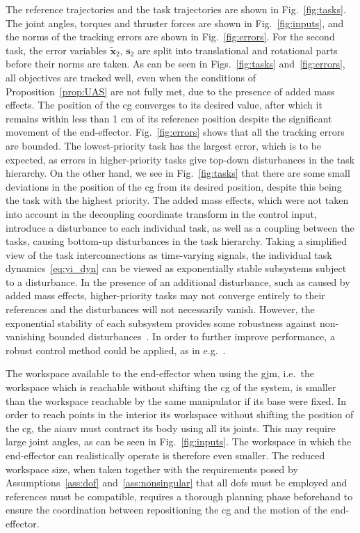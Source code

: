 \documentclass[../main.tex]{subfiles}
\begin{document}
 The reference trajectories and the task trajectories are shown in Fig.~\ref{fig:tasks}. The joint angles, torques and thruster forces are shown in Fig.~\ref{fig:inputs}, and the norms of the tracking errors are shown in Fig.~\ref{fig:errors}. For the second task, the error variables $\tilde{\bm{x}}_2,\, \bm{s}_2$ are split into translational and rotational parts before their norms are taken. As can be seen in Figs.~\ref{fig:tasks} and~\ref{fig:errors}, all objectives are tracked well, even when the conditions of Proposition~\ref{prop:UAS} are not fully met, due to the presence of added mass effects. The position of the \gls{cg} converges to its desired value, after which it remains within less than 1 cm of its reference position despite the significant movement of the end-effector.
Fig.~\ref{fig:errors} shows that all the tracking errors are bounded. The lowest-priority task has the largest error, which is to be expected, as errors in higher-priority tasks give top-down disturbances in the task hierarchy. On the other hand, we see in Fig.~\ref{fig:tasks} that there are some small deviations in the position of the \gls{cg} from its desired position, despite this being the task with the highest priority. %
The added mass effects, which were not taken into account in the decoupling coordinate transform in the control input, introduce a disturbance to each individual task, as well as a coupling between the tasks, causing bottom-up disturbances in the task hierarchy.
Taking a simplified view of the task interconnections as time-varying signals, the individual task dynamics~\eqref{eq:yi_dyn} can be viewed as exponentially stable subsystems subject to a disturbance. In the presence of an additional disturbance, such as caused by added mass effects, higher-priority tasks may not converge entirely to their references and the disturbances will not necessarily vanish. However, the exponential stability of each subsystem provides some robustness against non-vanishing bounded disturbances~\citep[Lemma 9.2]{Khalil}. In order to further improve performance, a robust control method could be applied, as in e.g.~\cite{DyrhaugTveter2023}.

The workspace available to the end-effector when using the \gls{gjm}, i.e.~the workspace which is reachable without shifting the \gls{cg} of the system, is smaller than the workspace reachable by the same manipulator if its base were fixed. %
 In order to reach points in the interior its workspace without shifting the position of the \gls{cg}, the \gls{aiauv} must contract its body using all its joints. This may require large joint angles, as can be seen in Fig.~\ref{fig:inputs}. The workspace in which the end-effector can realistically operate is therefore even smaller. The reduced workspace size, when taken together with the requirements posed by Assumptions~\ref{ass:dof} and~\ref{ass:nonsingular} that all \glspl{dof} must be employed and references must be compatible, requires a thorough planning phase beforehand to ensure the coordination between repositioning the \gls{cg} and the motion of the end-effector.
\end{document}
